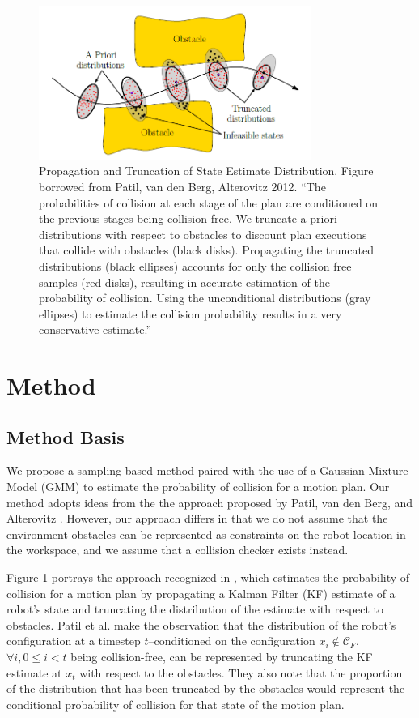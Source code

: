 \documentclass[journal]{IEEEtran}
\begin{document}
\begin{figure}[!t]
\centering
\includegraphics[width=3.5in]{motion_pic.PNG}
\caption{Propagation and Truncation of State Estimate Distribution. Figure borrowed from Patil, van den Berg, Alterovitz 2012. ``The probabilities of collision at each stage of the plan are conditioned on the previous stages being collision free. We truncate a priori distributions with respect to obstacles to discount plan executions that collide with obstacles (black disks). Propagating the truncated distributions (black ellipses) accounts for only the collision free samples (red disks), resulting in accurate estimation of the probability of collision. Using the unconditional distributions (gray ellipses) to estimate the collision probability results in a very conservative estimate.''\cite{IEEEhowto:patil}}
\label{patil_figure}
\end{figure}

\section{Method}
\subsection{Method Basis}

We propose a sampling-based method paired with the use of a Gaussian Mixture Model (GMM) to estimate the probability of collision for a motion plan. Our method adopts ideas from the the approach proposed by Patil, van den Berg, and Alterovitz \cite{IEEEhowto:patil}. However, our approach differs in that we do not assume that the environment obstacles can be represented as constraints on the robot location in the workspace, and we assume that a collision checker exists instead.

Figure \ref{patil_figure} portrays the approach recognized in \cite{IEEEhowto:patil}, which estimates the probability of collision for a motion plan by propagating a Kalman Filter (KF) estimate of a robot's state and truncating the distribution of the estimate with respect to obstacles. Patil et al. make the observation that the distribution of the robot's configuration at a timestep $t$--conditioned on the configuration $x_i \notin \mathcal{C}_F$, $\forall i, 0 \leq i < t $ being collision-free, can be represented by truncating the KF estimate at $x_t$ with respect to the obstacles. They also note that the proportion of the distribution that has been truncated by the obstacles would represent the conditional probability of collision for that state of the motion plan.
\end{document}
